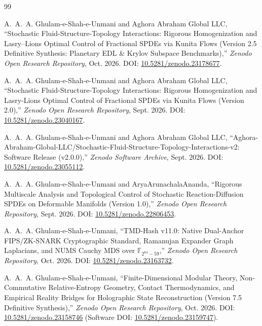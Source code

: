 \documentclass[11pt,a4paper,reqno]{article}
\theoremstyle{definition}
\theoremstyle{remark}
\begin{document}
\begin{thebibliography}{99}

A.~A.~A. Ghulam-e-Shah-e-Unmani and {Aghora Abraham Global LLC},
``Stochastic Fluid-Structure-Topology Interactions: Rigorous Homogenization and Lasry--Lions Optimal Control of Fractional SPDEs via Kunita Flows (Version 2.5 Definitive Synthesis: Planetary EDL \& Krylov Subspace Benchmarks),''
\emph{Zenodo Open Research Repository}, Oct. 2026.
DOI: \href{https://doi.org/10.5281/zenodo.23178677}{10.5281/zenodo.23178677}.

A.~A.~A. Ghulam-e-Shah-e-Unmani and {Aghora Abraham Global LLC},
``Stochastic Fluid-Structure-Topology Interactions: Rigorous Homogenization and Lasry-Lions Optimal Control of Fractional SPDEs via Kunita Flows (Version 2.0),''
\emph{Zenodo Open Research Repository}, Sept. 2026.
DOI: \href{https://doi.org/10.5281/zenodo.23040167}{10.5281/zenodo.23040167}.

A.~A.~A. Ghulam-e-Shah-e-Unmani and {Aghora Abraham Global LLC},
``Aghora-Abraham-Global-LLC/Stochastic-Fluid-Structure-Topology-Interactions-v2: Software Release (v2.0.0),''
\emph{Zenodo Software Archive}, Sept. 2026.
DOI: \href{https://doi.org/10.5281/zenodo.23055112}{10.5281/zenodo.23055112}.

A.~A.~A. Ghulam-e-Shah-e-Unmani and AryaArunachalaAnanda,
``Rigorous Multiscale Analysis and Topological Control of Stochastic Reaction-Diffusion SPDEs on Deformable Manifolds (Version 1.0),''
\emph{Zenodo Open Research Repository}, Sept. 2026.
DOI: \href{https://doi.org/10.5281/zenodo.22806453}{10.5281/zenodo.22806453}.

A.~A.~A. Ghulam-e-Shah-e-Unmani,
``TMD-Hash v11.0: Native Dual-Anchor FIPS/ZK-SNARK Cryptographic Standard, Ramanujan Expander Graph Laplacians, and NUMS Cauchy MDS over $\mathbb{F}_{2^{64}-59}$,''
\emph{Zenodo Open Research Repository}, Oct. 2026.
DOI: \href{https://doi.org/10.5281/zenodo.23163732}{10.5281/zenodo.23163732}.

A.~A.~A. Ghulam-e-Shah-e-Unmani,
``Finite-Dimensional Modular Theory, Non-Commutative Relative-Entropy Geometry, Contact Thermodynamics, and Empirical Reality Bridges for Holographic State Reconstruction (Version 7.5 Definitive Synthesis),''
\emph{Zenodo Open Research Repository}, Oct. 2026.
DOI: \href{https://doi.org/10.5281/zenodo.23158746}{10.5281/zenodo.23158746} (Software DOI: \href{https://doi.org/10.5281/zenodo.23159747}{10.5281/zenodo.23159747}).


\end{thebibliography}
\end{document}
